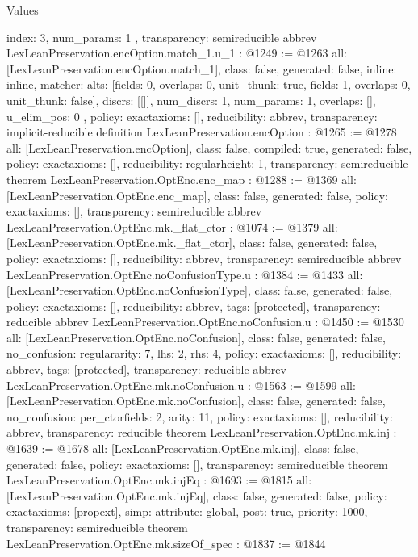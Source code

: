 \begin{lexlean}{Values}
\begin{coremodule}
{{    index: 3,
    num_params: 1
  },
  transparency: semireducible
}
abbrev LexLeanPreservation.encOption.match_1.{u_1} : @1249 := @1263 {
  all: [LexLeanPreservation.encOption.match_1],
  class: false,
  generated: false,
  inline: inline,
  matcher: {
    alts: [{fields: 0, overlaps: 0, unit_thunk: true}, {fields: 1, overlaps: 0, unit_thunk: false}],
    discrs: [[]],
    num_discrs: 1,
    num_params: 1,
    overlaps: [],
    u_elim_pos: 0
  },
  policy: exact{axioms: []},
  reducibility: abbrev{},
  transparency: implicit-reducible
}
definition LexLeanPreservation.encOption : @1265 := @1278 {
  all: [LexLeanPreservation.encOption],
  class: false,
  compiled: true,
  generated: false,
  policy: exact{axioms: []},
  reducibility: regular{height: 1},
  transparency: semireducible
}
theorem LexLeanPreservation.OptEnc.enc_map : @1288 := @1369 {
  all: [LexLeanPreservation.OptEnc.enc_map],
  class: false,
  generated: false,
  policy: exact{axioms: []},
  transparency: semireducible
}
abbrev LexLeanPreservation.OptEnc.mk._flat_ctor : @1074 := @1379 {
  all: [LexLeanPreservation.OptEnc.mk._flat_ctor],
  class: false,
  generated: false,
  policy: exact{axioms: []},
  reducibility: abbrev{},
  transparency: semireducible
}
abbrev LexLeanPreservation.OptEnc.noConfusionType.{u} : @1384 := @1433 {
  all: [LexLeanPreservation.OptEnc.noConfusionType],
  class: false,
  generated: false,
  policy: exact{axioms: []},
  reducibility: abbrev{},
  tags: [protected],
  transparency: reducible
}
abbrev LexLeanPreservation.OptEnc.noConfusion.{u} : @1450 := @1530 {
  all: [LexLeanPreservation.OptEnc.noConfusion],
  class: false,
  generated: false,
  no_confusion: regular{arity: 7, lhs: 2, rhs: 4},
  policy: exact{axioms: []},
  reducibility: abbrev{},
  tags: [protected],
  transparency: reducible
}
abbrev LexLeanPreservation.OptEnc.mk.noConfusion.{u} : @1563 := @1599 {
  all: [LexLeanPreservation.OptEnc.mk.noConfusion],
  class: false,
  generated: false,
  no_confusion: per_ctor{fields: 2, arity: 11},
  policy: exact{axioms: []},
  reducibility: abbrev{},
  transparency: reducible
}
theorem LexLeanPreservation.OptEnc.mk.inj : @1639 := @1678 {
  all: [LexLeanPreservation.OptEnc.mk.inj],
  class: false,
  generated: false,
  policy: exact{axioms: []},
  transparency: semireducible
}
theorem LexLeanPreservation.OptEnc.mk.injEq : @1693 := @1815 {
  all: [LexLeanPreservation.OptEnc.mk.injEq],
  class: false,
  generated: false,
  policy: exact{axioms: [propext]},
  simp: {attribute: global, post: true, priority: 1000},
  transparency: semireducible
}
theorem LexLeanPreservation.OptEnc.mk.sizeOf_spec : @1837 := @1844 {
}
\end{coremodule}
\end{lexlean}
